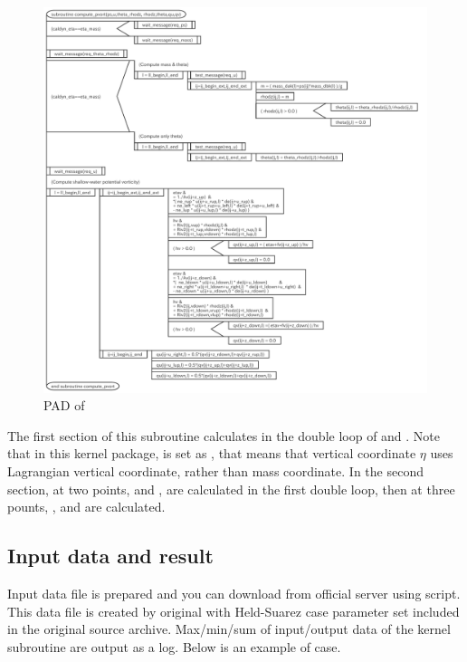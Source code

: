 \begin{figure}[htbp]
 \centering
 \includegraphics[scale=.4]{figs/pvort.pdf}
 \caption{PAD of }\label{f:pad_comp_pvort}%
\end{figure}

The first section of this subroutine calculates  in the
double loop of  and .
%
Note that in this kernel package,  is set as
, that means that vertical coordinate $\eta$ uses
Lagrangian vertical coordinate, rather than mass coordinate.
%
In the second section,  at two points,  and
, are calculated in the first double loop, then
 at three pounts, , 
and  are calculated.

\clearpage



\subsection{Input data and result}

Input data file is prepared and you can download from official server using
 script.
%
This data file is created by original \DYNAMICO\footnotemark with
Held-Suarez case parameter set included in the original source archive.
%
%
Max/min/sum of input/output data of the kernel subroutine are output as
a log.
%
Below is an example of  case.

